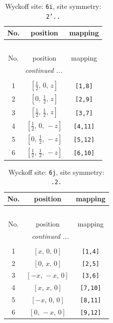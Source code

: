 \documentclass[fleqn,8pt]{jsarticle}
\begin{document}
\renewcommand{\arraystretch}{1.2}
\begin{longtable}{ccc}
\caption{Wyckoff site: {\tt 6i}, site symmetry: {\tt 2'..}}
 \\
 \hline \hline
No. & position & mapping \\ \hline \endfirsthead

\multicolumn{2}{l}{\tablename\ \thetable{}} \\
 \hline \hline
No. & position & mapping \\ \hline \endhead

 \hline \hline
\multicolumn{2}{r}{\footnotesize\it continued ...} \\ \endfoot

 \hline \hline
\multicolumn{2}{r}{} \\ \endlastfoot

1 & $\left[ \frac{1}{2},\, 0,\, z \right]$ & {\tt [1,8]} \\ \hline
2 & $\left[ 0,\, \frac{1}{2},\, z \right]$ & {\tt [2,9]} \\ \hline
3 & $\left[ \frac{1}{2},\, \frac{1}{2},\, z \right]$ & {\tt [3,7]} \\ \hline
4 & $\left[ \frac{1}{2},\, 0,\, - z \right]$ & {\tt [4,11]} \\ \hline
5 & $\left[ 0,\, \frac{1}{2},\, - z \right]$ & {\tt [5,12]} \\ \hline
6 & $\left[ \frac{1}{2},\, \frac{1}{2},\, - z \right]$ & {\tt [6,10]} \\
\end{longtable}
\renewcommand{\arraystretch}{1.2}
\begin{longtable}{ccc}
\caption{Wyckoff site: {\tt 6j}, site symmetry: {\tt .2.}}
 \\
 \hline \hline
No. & position & mapping \\ \hline \endfirsthead

\multicolumn{2}{l}{\tablename\ \thetable{}} \\
 \hline \hline
No. & position & mapping \\ \hline \endhead

 \hline \hline
\multicolumn{2}{r}{\footnotesize\it continued ...} \\ \endfoot

 \hline \hline
\multicolumn{2}{r}{} \\ \endlastfoot

1 & $\left[ x,\, 0,\, 0 \right]$ & {\tt [1,4]} \\ \hline
2 & $\left[ 0,\, x,\, 0 \right]$ & {\tt [2,5]} \\ \hline
3 & $\left[ - x,\, - x,\, 0 \right]$ & {\tt [3,6]} \\ \hline
4 & $\left[ x,\, x,\, 0 \right]$ & {\tt [7,10]} \\ \hline
5 & $\left[ - x,\, 0,\, 0 \right]$ & {\tt [8,11]} \\ \hline
6 & $\left[ 0,\, - x,\, 0 \right]$ & {\tt [9,12]} \\
\end{longtable}
\end{document}
